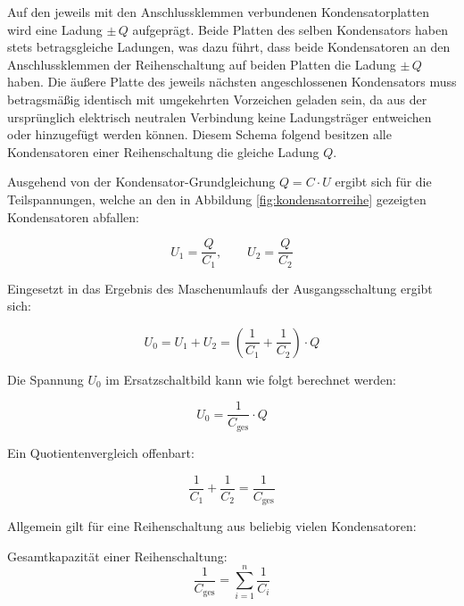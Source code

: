 \begin{frame}
{\begin{figure}[h!]
			

			
		\end{figure}

		
		
		Auf den jeweils mit den Anschlussklemmen verbundenen Kondensatorplatten wird eine Ladung $\pm \, Q$ aufgeprägt.
		Beide Platten des selben Kondensators haben stets betragsgleiche Ladungen, was dazu führt, dass beide Kondensatoren an den Anschlussklemmen
		der Reihenschaltung auf beiden Platten die Ladung $\pm \, Q$ haben. Die äußere Platte des jeweils nächsten angeschlossenen Kondensators
		muss betragsmäßig identisch mit umgekehrten Vorzeichen geladen sein, da aus der ursprünglich elektrisch neutralen Verbindung keine 
		Ladungsträger entweichen oder hinzugefügt werden können. Diesem Schema folgend besitzen alle Kondensatoren
		einer Reihenschaltung die gleiche Ladung $Q$.

		Ausgehend von der Kondensator-Grundgleichung $Q = C \cdot U$ ergibt sich für die Teilspannungen, welche an den
		in Abbildung \ref{fig:kondensatorreihe} gezeigten Kondensatoren abfallen:

		\begin{equation*}
			U_1 = \frac{Q}{C_1}, \quad \quad U_2 = \frac{Q}{C_2}		
		\end{equation*}

		Eingesetzt in das Ergebnis des Maschenumlaufs der Ausgangsschaltung ergibt sich:

		\begin{equation*}
			U_0 = U_1 + U_2 = \left( \frac{1}{C_1} + \frac{1}{C_2} \right) \cdot Q
		\end{equation*}

		Die Spannung $U_0$ im Ersatzschaltbild kann wie folgt berechnet werden:

		\begin{equation*}
			U_0 = \frac{1}{C_\mathrm{ges}} \cdot Q
		\end{equation*}

		Ein Quotientenvergleich offenbart:

		\begin{equation*}
			\frac{1}{C_1} + \frac{1}{C_2} = \frac{1}{C_\mathrm{ges}}
		\end{equation*}

		Allgemein gilt für eine Reihenschaltung aus beliebig vielen Kondensatoren:

		\begin{Merksatz}{Gesamtkapazität einer Reihenschaltung:}
			\begin{equation}
				\frac{1}{C_\mathrm{ges}} = \sum_{i = 1}^{n} \frac{1}{C_i}
			\end{equation}
		\end{Merksatz}

}
\end{frame}
